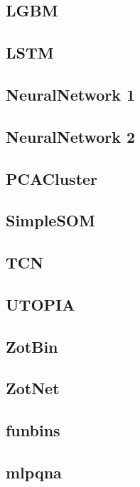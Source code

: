 \documentclass[twocolumn,twocolappendix]{aastex63}
\begin{document}
\subsection{ {\sc LGBM} }


\subsection{ {\sc LSTM} }


\subsection{ {\sc NeuralNetwork 1} }


\subsection{ {\sc NeuralNetwork 2} }


\subsection{ {\sc PCACluster} }


\subsection{ {\sc SimpleSOM} }


\subsection{ {\sc TCN} }


\subsection{ {\sc UTOPIA} }


\subsection{ {\sc ZotBin} }


\subsection{ {\sc ZotNet} }


\subsection{ {\sc funbins} }


\subsection{ {\sc mlpqna} }
\end{document}
